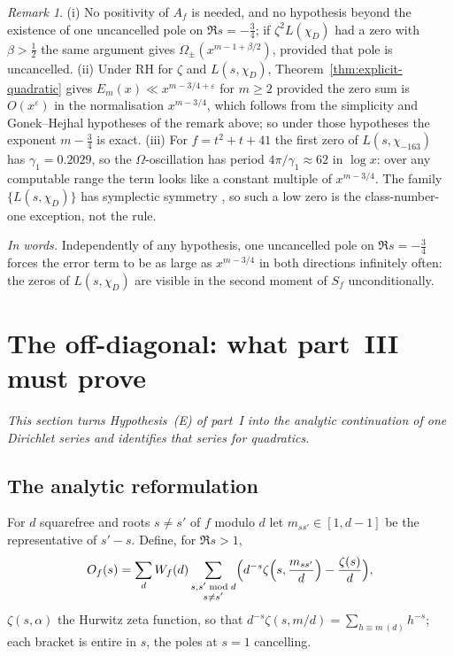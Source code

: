 \documentclass[11pt,a4paper]{article}
\theoremstyle{remark}\newtheorem{remark}[theorem]{Remark}
\begin{document}
\begin{remark}
(i) No positivity of $A_f$ is needed, and no hypothesis beyond the existence of one uncancelled pole on
$\Re s=-\tfrac34$; if $\zeta^2L(\chi_D)$ had a zero with $\beta>\tfrac12$ the same argument gives
$\Omega_\pm(x^{m-1+\beta/2})$, provided that pole is uncancelled. (ii) Under RH for $\zeta$ and
$L(s,\chi_D)$, Theorem~\ref{thm:explicit-quadratic} gives $E_m(x)\ll x^{m-3/4+\varepsilon}$ for $m\ge2$
provided the zero sum is $O(x^{\varepsilon})$ in the normalisation $x^{m-3/4}$, which follows from the
simplicity and Gonek--Hejhal hypotheses of the remark above; so under those hypotheses the exponent
$m-\tfrac34$ is exact. (iii) For $f=t^2+t+41$ the first zero of $L(s,\chi_{-163})$ has $\gamma_1=0.2029$, so the
$\Omega$-oscillation has period $4\pi/\gamma_1\approx62$ in $\log x$: over any computable range the term
looks like a constant multiple of $x^{m-3/4}$. The family $\{L(s,\chi_D)\}$ has symplectic symmetry
\cite{KatzSarnak1999}, so such a low zero is the class-number-one exception, not the rule.
\end{remark}

\emph{In words.} Independently of any hypothesis, one uncancelled pole on $\Re s=-\tfrac34$ forces the error
term to be as large as $x^{m-3/4}$ in both directions infinitely often: the zeros of $L(s,\chi_D)$ are
visible in the second moment of $S_f$ unconditionally.

\section{The off-diagonal: what part~III must prove}\label{sec:off}

\emph{This section turns Hypothesis~(E) of part~I into the analytic continuation of one Dirichlet series
and identifies that series for quadratics.}

\subsection{The analytic reformulation}

For $d$ squarefree and roots $s\ne s'$ of $f$ modulo $d$ let $m_{ss'}\in[1,d-1]$ be the representative of
$s'-s$. Define, for $\Re s>1$,
\begin{equation}\label{eq:Of}
O_f(s)=\sum_{d}W_f(d)\sum_{\substack{s,s'\bmod d\\ s\ne s'}}\Bigl(d^{-s}\zeta\Bigl(s,\frac{m_{ss'}}d\Bigr)-\frac{\zeta(s)}d\Bigr),
\end{equation}
$\zeta(s,\alpha)$ the Hurwitz zeta function, so that $d^{-s}\zeta(s,m/d)=\sum_{h\equiv m\ (d)}h^{-s}$; each bracket is
entire in $s$, the poles at $s=1$ cancelling.
\end{document}
